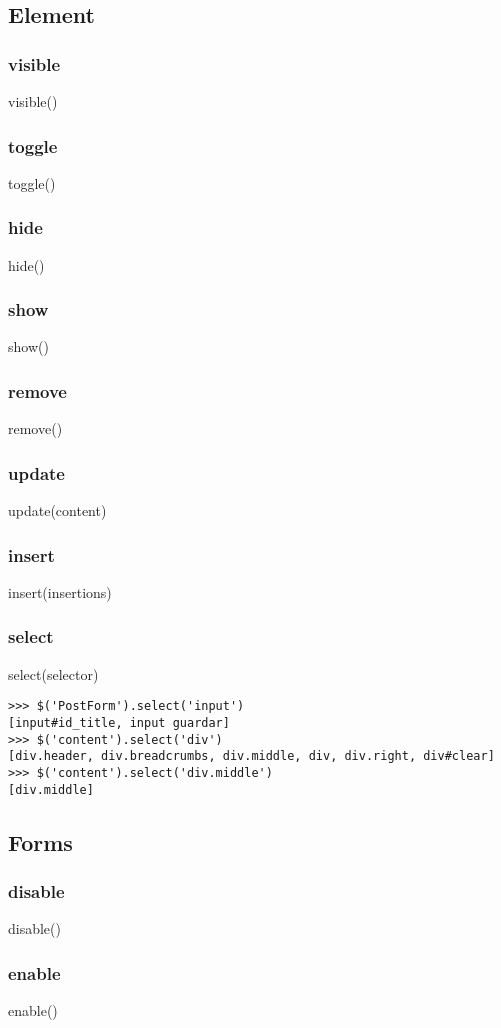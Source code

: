 {{\subsection{Element}
\subsubsection*{visible}
visible()
\subsubsection*{toggle}
toggle()
\subsubsection*{hide}
hide()
\subsubsection*{show}
show()
\subsubsection*{remove}
remove()
\subsubsection*{update}
update(content)
\subsubsection*{insert}
insert(insertions)
\subsubsection*{select}
select(selector)

\begin{lstlisting}[style=consola]
>>> $('PostForm').select('input')
[input#id_title, input guardar]
>>> $('content').select('div')
[div.header, div.breadcrumbs, div.middle, div, div.right, div#clear]
>>> $('content').select('div.middle')
[div.middle]
\end{lstlisting}

\subsection{Forms}
\subsubsection*{disable}
disable()
\subsubsection*{enable}
enable()
}}
